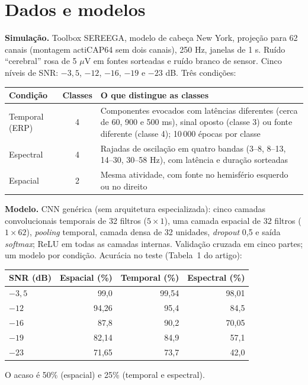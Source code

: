 \documentclass[11pt,a4paper]{article}
\begin{document}
\section{Dados e modelos}
\textbf{Simulação.} Toolbox SEREEGA, modelo de cabeça New York, projeção para 62 canais (montagem actiCAP64 sem dois canais), 250 Hz, janelas de 1 s. Ruído “cerebral” rosa de 5 $\mu$V em fontes sorteadas e ruído branco de sensor. Cinco níveis de SNR: $-3{,}5$, $-12$, $-16$, $-19$ e $-23$ dB. Três condições:
\begin{center}\small
\begin{tabularx}{\linewidth}{lcX}
\toprule
\textbf{Condição} & \textbf{Classes} & \textbf{O que distingue as classes} \\
\midrule
Temporal (ERP) & 4 & Componentes evocados com latências diferentes (cerca de 60, 900 e 500 ms), sinal oposto (classe 3) ou fonte diferente (classe 4); 10\,000 épocas por classe \\
Espectral & 4 & Rajadas de oscilação em quatro bandas (3--8, 8--13, 14--30, 30--58 Hz), com latência e duração sorteadas \\
Espacial & 2 & Mesma atividade, com fonte no hemisfério esquerdo ou no direito \\
\bottomrule
\end{tabularx}
\end{center}
\textbf{Modelo.} CNN genérica (sem arquitetura especializada): cinco camadas convolucionais temporais de 32 filtros ($5\times1$), uma camada espacial de 32 filtros ($1\times62$), \textit{pooling} temporal, camada densa de 32 unidades, \textit{dropout} 0,5 e saída \textit{softmax}; ReLU em todas as camadas internas. Validação cruzada em cinco partes; um modelo por condição. Acurácia no teste (Tabela~1 do artigo):
\begin{center}\small
\begin{tabular}{lrrr}
\toprule
\textbf{SNR (dB)} & \textbf{Espacial (\%)} & \textbf{Temporal (\%)} & \textbf{Espectral (\%)} \\
\midrule
$-3{,}5$ & 99,0 & 99,54 & 98,01 \\
$-12$    & 94,26 & 95,4 & 84,5 \\
$-16$    & 87,8 & 90,2 & 70,05 \\
$-19$    & 82,14 & 84,9 & 57,1 \\
$-23$    & 71,65 & 73,7 & 42,0 \\
\bottomrule
\end{tabular}
\end{center}
O acaso é 50\% (espacial) e 25\% (temporal e espectral).
\end{document}
